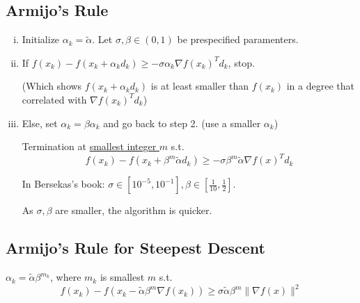 \documentclass[11pt,a4paper]{article}
\begin{document}
\subsection{Armijo's Rule}
\begin{enumerate}[(i)]
    \item Initialize $\alpha_k=\tilde{\alpha}$. Let $\sigma,\beta \in (0,1)$ be prespecified paramenters.
    \item If $f(x_k)-f(x_k+\alpha_k d_k)\geq-\sigma \alpha_k \nabla f(x_k)^T d_k$, stop.
    
    (Which shows $f(x_k+\alpha_k d_k)$ is at least smaller than $f(x_k)$ in a degree that correlated with $\nabla f(x_k)^T d_k$)
    \item Else, set $\alpha_k=\beta\alpha_k$ and go back to step 2. (use a smaller $\alpha_k$)
    
    Termination at \underline{smallest integer $m$} s.t. $$f(x_k)-f(x_k+\beta^m \tilde{\alpha} d_k)\geq-\sigma\beta^m \tilde{\alpha}\nabla f(x)^T d_k$$

    In Bersekas's book: $\sigma\in[10^{-5},10^{-1}],\beta\in[\frac{1}{10},\frac{1}{2}]$.

    As $\sigma,\beta$ are smaller, the algorithm is quicker.
\end{enumerate}

\subsection{Armijo's Rule for Steepest Descent}
$\alpha_k=\tilde{\alpha}\beta^{m_k}$, where $m_k$ is smallest $m$ s.t. $$f(x_k)-f(x_k-\tilde{\alpha}\beta^{m} \nabla f(x_k))\geq \sigma\tilde{\alpha}\beta^{m}\|\nabla f(x)\|^2$$
\end{document}
